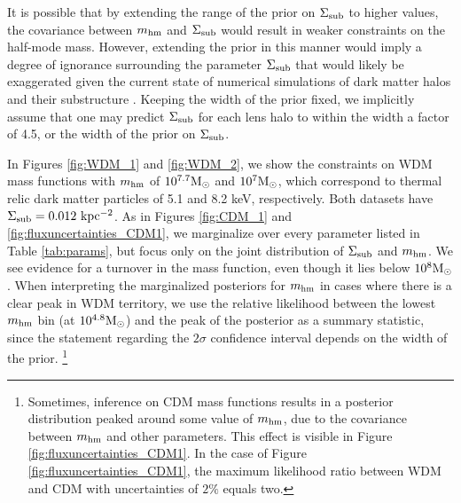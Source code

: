 It is possible that by extending the range of the prior on $\Sigma_{\rm{sub}}$ to higher values, the covariance between ${m_{\rm{hm}}}$ and $\Sigma_{\rm{sub}}$ would result in weaker constraints on the half-mode mass. However, extending the prior in this manner would imply a degree of ignorance surrounding the parameter $\Sigma_{\rm{sub}}$ that would likely be exaggerated given the current state of numerical simulations of dark matter halos and their substructure \citep{Benson12,Wheeler++18,Bozek++18,Lovell++18}. Keeping the width of the prior fixed, we implicitly assume that one may predict $\Sigma_{\rm{sub}}$ for each lens halo to within the width a factor of 4.5, or the width of the prior on $\Sigma_{\rm{sub}}$. 

In Figures \ref{fig:WDM_1} and \ref{fig:WDM_2}, we show the constraints on WDM mass functions with ${m_{\rm{hm}}}$ of $10^{7.7} {\rm{M}_{\odot}}$ and $10^{7} {\rm{M}_{\odot}}$, which correspond to thermal relic dark matter particles of 5.1 and 8.2 keV, respectively. Both datasets have $\Sigma_{\rm{sub}} = 0.012 \ \rm{kpc^{-2}}$. As in Figures \ref{fig:CDM_1} and \ref{fig:fluxuncertainties_CDM1}, we marginalize over every parameter listed in Table \ref{tab:params}, but focus only on the joint distribution of $\Sigma_{\rm{sub}}$ and ${m_{\rm{hm}}}$. We see evidence for a turnover in the mass function, even though it lies below $10^8 {\rm{M}_{\odot}}$. When interpreting the marginalized posteriors for ${m_{\rm{hm}}}$ in cases where there is a clear peak in WDM territory, we use the relative likelihood between the lowest ${m_{\rm{hm}}}$ bin (at $10^{4.8}{\rm{M}_{\odot}}$) and the peak of the posterior as a summary statistic, since the statement regarding the $2 \sigma$ confidence interval depends on the width of the prior. \footnote{Sometimes, inference on CDM mass functions results in a posterior distribution peaked around some value of ${m_{\rm{hm}}}$, due to the covariance between ${m_{\rm{hm}}}$ and other parameters. This effect is visible in Figure \ref{fig:fluxuncertainties_CDM1}. In the case of Figure \ref{fig:fluxuncertainties_CDM1}, the maximum likelihood ratio between WDM and CDM with uncertainties of $2\%$ equals two.} 

